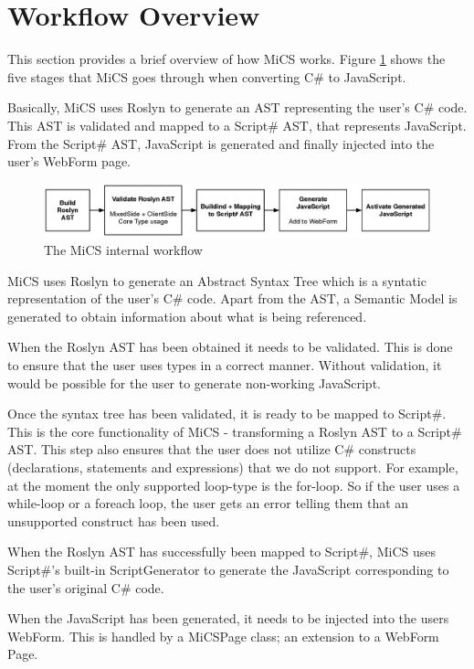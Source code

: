 \section{Workflow Overview} %
\label{sec:workflow_overview}

This section provides a brief overview of how MiCS works. Figure \ref{fig:mics_internal_workflow} shows the five stages that MiCS goes through when converting C\# to JavaScript.

Basically, MiCS uses Roslyn to generate an AST representing the user’s C\# code. This AST is validated and mapped to a Script\# AST, that represents JavaScript. From the Script\# AST, JavaScript is generated and finally injected into the user’s WebForm page.

\begin{figure}[H]
	\begin{center}
		\centerline{\includegraphics[width=14cm]{resources/images/internalworkflow.eps}}
	\end{center}
	\caption{The MiCS internal workflow}
	\label{fig:mics_internal_workflow}
\end{figure}

MiCS uses Roslyn to generate an Abstract Syntax Tree which is a syntatic representation of the user’s C\# code. Apart from the AST, a Semantic Model is generated to obtain information about what is being referenced.

When the Roslyn AST has been obtained it needs to be validated. This is done to ensure that the user uses types in a correct manner. Without validation, it would be possible for the user to generate non-working JavaScript.

Once the syntax tree has been validated, it is ready to be mapped to Script\#. This is the core functionality of MiCS - transforming a Roslyn AST to a Script\# AST. This step also ensures that the user does not utilize C\# constructs (declarations, statements and expressions) that we do not support. For example, at the moment the only supported loop-type is the for-loop. So if the user uses a while-loop or a foreach loop, the user gets an error telling them that an unsupported construct has been used.

When the Roslyn AST has successfully been mapped to Script\#, MiCS uses Script\#’s built-in ScriptGenerator to generate the JavaScript corresponding to the user’s original C\# code. 

When the JavaScript has been generated, it needs to be injected into the users WebForm. This is handled by a MiCSPage class; an extension to a WebForm Page. 


